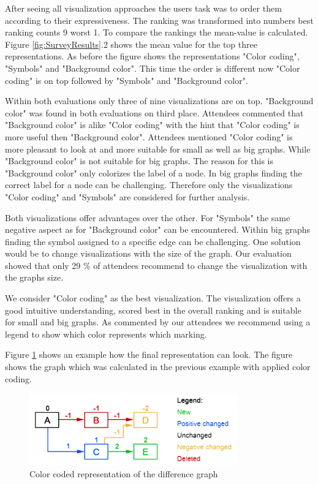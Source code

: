 \documentclass{llncs}
\begin{document}
After seeing all visualization approaches the users task was to order them according to their expressiveness. The ranking was transformed into numbers best ranking counts 9 worst 1. To compare the rankings the mean-value is calculated. Figure \ref{fig:SurveyResults}.2 shows the mean value for the top three representations. As before the figure shows the representations "Color coding", "Symbols" and "Background color". This time the order is different now "Color coding" is on top followed by "Symbols" and "Background color".

Within both evaluations only three of nine visualizations are on top. "Background color" was found in both evaluations on third place. Attendees commented that "Background color" is alike "Color coding" with the hint that "Color coding" is more useful then "Background color". Attendees mentioned "Color coding" is more pleasant to look at and more suitable for small as well as big graphs. While "Background color" is not suitable for big graphs. The reason for this is "Background color" only colorizes the label of a node. In big graphs finding the correct label for a node can be challenging. Therefore only the visualizations "Color coding" and "Symbols" are considered for further analysis.

Both visualizations offer advantages over the other. For "Symbols" the same negative aspect as for "Background color" can be encountered. Within big graphs finding the symbol assigned to a specific edge can be challenging. One solution would be to change visualizations with the size of the graph. Our evaluation showed that only 29 \% of attendees recommend to change the visualization with the graphs size.

We consider "Color coding" as the best visualization. The visualization offers a good intuitive understanding, scored best in the overall ranking and is suitable for small and big graphs. As commented by our attendees we recommend using a legend to show which color represents which marking.

Figure \ref{fig:DiffGraphVisualization} shows an example how the final representation can look. The figure shows the graph which was calculated in the previous example with applied color coding.

\begin{figure}
	\centering
	\includegraphics[width=0.8\textwidth]{Images/ColorCodedGraph.PNG}
	\caption{Color coded representation of the difference graph}
	\label{fig:DiffGraphVisualization}
\end{figure}
\end{document}
